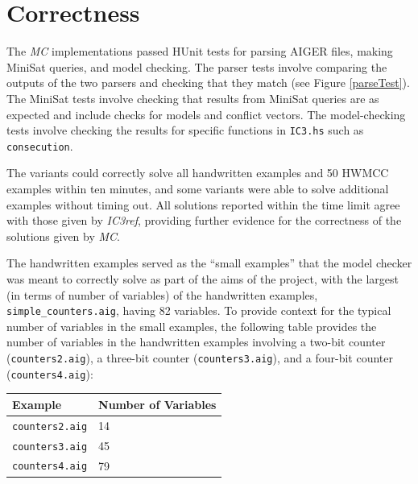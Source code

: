 \documentclass[12pt,a4paper,twoside,openright]{report}
\begin{document}
{{\section{Correctness}
\label{eval:solving}

The \emph{MC} implementations passed HUnit tests for parsing AIGER files,
making MiniSat queries, and model checking. The parser tests involve comparing
the outputs of the two parsers and checking that they match (see Figure
\ref{parseTest}). The MiniSat tests
involve checking that results from MiniSat queries are as expected and include checks
for models and conflict
vectors. The model-checking tests involve checking the results for specific
functions in \verb,IC3.hs, such as \verb,consecution,.

The variants could correctly solve all handwritten examples and 50 HWMCC examples
within ten minutes, and some
variants were able to solve additional examples without timing out.
All solutions reported within the time limit agree with those
given by \emph{IC3ref}, providing further evidence for the correctness of the solutions given
by \emph{MC}.

The handwritten examples served as the ``small examples'' that the model checker
was meant to correctly solve as part of the aims of the project, with the largest
(in terms of number of variables) of the handwritten examples,
\verb,simple_counters.aig,, having 82 variables. %
To provide context for the typical number of variables in the small examples,
the following table provides the number of variables in the handwritten examples involving
a two-bit counter (\verb,counters2.aig,), a three-bit counter (\verb,counters3.aig,),
and a four-bit counter (\verb,counters4.aig,):
\begin{center}
\begin{tabular}{|l | l|}
\hline
Example & Number of Variables \\
\hline
{\tt counters2.aig} & 14\\
{\tt counters3.aig} & 45\\
{\tt counters4.aig} & 79\\
\hline
\end{tabular}
\end{center}

}}
\end{document}
